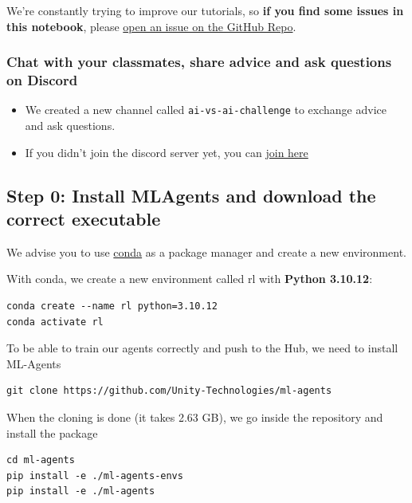 \documentclass[11pt,a4paper]{article}
\begin{document}
We're constantly trying to improve our tutorials, so \textbf{if you find some issues in this notebook}, please \href{https://github.com/huggingface/deep-rl-class/issues}{open an issue on the GitHub Repo}.

\subsubsection{Chat with your classmates, share advice and ask questions on Discord}\label{chat-with-your-classmates-share-advice-and-ask-questions-on-discord}

\begin{itemize}
\tightlist
\item
  We created a new channel called \texttt{ai-vs-ai-challenge} to exchange advice and ask questions.
\item
  If you didn't join the discord server yet, you can \href{https://discord.gg/ydHrjt3WP5}{join here}
\end{itemize}

\subsection{Step 0: Install MLAgents and download the correct executable}\label{step-0-install-mlagents-and-download-the-correct-executable}

We advise you to use \href{https://docs.conda.io/en/latest/}{conda} as a package manager and create a new environment.

With conda, we create a new environment called rl with \textbf{Python 3.10.12}:

\begin{lstlisting}
conda create --name rl python=3.10.12
conda activate rl
\end{lstlisting}

To be able to train our agents correctly and push to the Hub, we need to install ML-Agents

\begin{lstlisting}
git clone https://github.com/Unity-Technologies/ml-agents
\end{lstlisting}

When the cloning is done (it takes 2.63 GB), we go inside the repository and install the package

\begin{lstlisting}
cd ml-agents
pip install -e ./ml-agents-envs
pip install -e ./ml-agents
\end{lstlisting}
\end{document}
